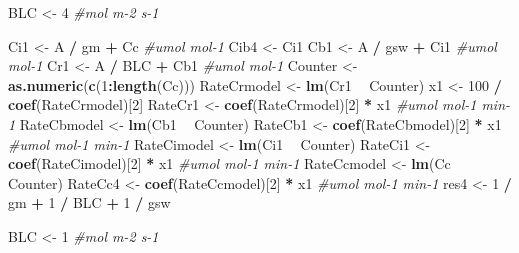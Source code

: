 \documentclass[
]{krantz}
\makeatletter
\newenvironment{Shaded}{\begin{snugshade}}{\end{snugshade}}
\newcommand{\CommentTok}[1]{\textcolor[rgb]{0.56,0.35,0.01}{\textit{#1}}}
\newcommand{\DecValTok}[1]{\textcolor[rgb]{0.00,0.00,0.81}{#1}}
\newcommand{\KeywordTok}[1]{\textcolor[rgb]{0.13,0.29,0.53}{\textbf{#1}}}
\newcommand{\NormalTok}[1]{#1}
\newcommand{\OperatorTok}[1]{\textcolor[rgb]{0.81,0.36,0.00}{\textbf{#1}}}
\newcommand{\StringTok}[1]{\textcolor[rgb]{0.31,0.60,0.02}{#1}}
\newenvironment{kframe}{%
\medskip{}
\setlength{\fboxsep}{.8em}
 \def\at@end@of@kframe{}%
 \ifinner\ifhmode%
  \def\at@end@of@kframe{\end{minipage}}%
  \begin{minipage}{\columnwidth}%
 \fi\fi%
 \def\FrameCommand##1{\hskip\@totalleftmargin \hskip-\fboxsep
 \colorbox{shadecolor}{##1}\hskip-\fboxsep
     \hskip-\linewidth \hskip-\@totalleftmargin \hskip\columnwidth}%
 \MakeFramed {\advance\hsize-\width
   \@totalleftmargin\z@ \linewidth\hsize
   \@setminipage}}%
 {\par\unskip\endMakeFramed%
 \at@end@of@kframe}
\renewenvironment{Shaded}{\begin{kframe}}{\end{kframe}}
\makeatother
\begin{document}
\begin{Shaded}
\begin{Highlighting}[]
\NormalTok{BLC <-}\StringTok{ }\DecValTok{4} \CommentTok{#mol m-2 s-1}

\NormalTok{Ci1 <-}\StringTok{ }\NormalTok{A }\OperatorTok{/}\StringTok{ }\NormalTok{gm }\OperatorTok{+}\StringTok{ }\NormalTok{Cc }\CommentTok{#umol mol-1}
\NormalTok{Cib4 <-}\StringTok{ }\NormalTok{Ci1}
\NormalTok{Cb1 <-}\StringTok{ }\NormalTok{A }\OperatorTok{/}\StringTok{ }\NormalTok{gsw }\OperatorTok{+}\StringTok{ }\NormalTok{Ci1 }\CommentTok{#umol mol-1}
\NormalTok{Cr1 <-}\StringTok{ }\NormalTok{A }\OperatorTok{/}\StringTok{ }\NormalTok{BLC }\OperatorTok{+}\StringTok{ }\NormalTok{Cb1 }\CommentTok{#umol mol-1}
\NormalTok{Counter <-}\StringTok{ }\KeywordTok{as.numeric}\NormalTok{(}\KeywordTok{c}\NormalTok{(}\DecValTok{1}\OperatorTok{:}\KeywordTok{length}\NormalTok{(Cc)))}
\NormalTok{RateCrmodel <-}\StringTok{ }\KeywordTok{lm}\NormalTok{(Cr1 }\OperatorTok{~}\StringTok{ }\NormalTok{Counter)}
\NormalTok{x1 <-}\StringTok{ }\DecValTok{100} \OperatorTok{/}\StringTok{ }\KeywordTok{coef}\NormalTok{(RateCrmodel)[}\DecValTok{2}\NormalTok{]}
\NormalTok{RateCr1 <-}\StringTok{ }\KeywordTok{coef}\NormalTok{(RateCrmodel)[}\DecValTok{2}\NormalTok{] }\OperatorTok{*}\StringTok{ }\NormalTok{x1 }\CommentTok{#umol mol-1 min-1}
\NormalTok{RateCbmodel <-}\StringTok{ }\KeywordTok{lm}\NormalTok{(Cb1 }\OperatorTok{~}\StringTok{ }\NormalTok{Counter)}
\NormalTok{RateCb1 <-}\StringTok{ }\KeywordTok{coef}\NormalTok{(RateCbmodel)[}\DecValTok{2}\NormalTok{] }\OperatorTok{*}\StringTok{ }\NormalTok{x1 }\CommentTok{#umol mol-1 min-1}
\NormalTok{RateCimodel <-}\StringTok{ }\KeywordTok{lm}\NormalTok{(Ci1 }\OperatorTok{~}\StringTok{ }\NormalTok{Counter)}
\NormalTok{RateCi1 <-}\StringTok{ }\KeywordTok{coef}\NormalTok{(RateCimodel)[}\DecValTok{2}\NormalTok{] }\OperatorTok{*}\StringTok{ }\NormalTok{x1 }\CommentTok{#umol mol-1 min-1}
\NormalTok{RateCcmodel <-}\StringTok{ }\KeywordTok{lm}\NormalTok{(Cc }\OperatorTok{~}\StringTok{ }\NormalTok{Counter)}
\NormalTok{RateCc4 <-}\StringTok{ }\KeywordTok{coef}\NormalTok{(RateCcmodel)[}\DecValTok{2}\NormalTok{] }\OperatorTok{*}\StringTok{ }\NormalTok{x1 }\CommentTok{#umol mol-1 min-1}
\NormalTok{res4 <-}\StringTok{ }\DecValTok{1} \OperatorTok{/}\StringTok{ }\NormalTok{gm }\OperatorTok{+}\StringTok{ }\DecValTok{1} \OperatorTok{/}\StringTok{ }\NormalTok{BLC }\OperatorTok{+}\StringTok{ }\DecValTok{1} \OperatorTok{/}\StringTok{ }\NormalTok{gsw}

\NormalTok{BLC <-}\StringTok{ }\DecValTok{1} \CommentTok{#mol m-2 s-1}


\end{Highlighting}
\end{Shaded}
\end{document}
